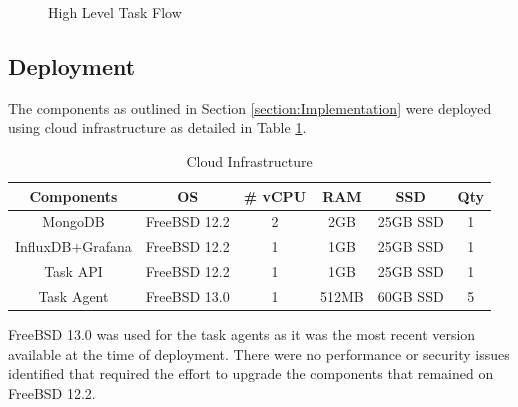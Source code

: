 \documentclass{mscreport}
\begin{document}

\begin{figure}[p]
	\begin{center}
        \scalebox{0.47}{}
		\caption{High Level Task Flow}
		\label{fig:task_flow}
	\end{center}
\end{figure}

\clearpage
\newpage

\subsection{Deployment}

The components as outlined in Section \ref{section:Implementation} were deployed using cloud infrastructure as detailed in Table \ref{table:implmentation_cloud}.

\begin{table}[H]
  \begin{center}
    \begin{tabular}{|c|c|c|c|c|c|}  %
      \hline
      \textbf{Components} & \textbf{OS} & \textbf{\# vCPU} & \textbf{RAM} & \textbf{SSD} & \textbf{Qty}\\
      \hline
      MongoDB & FreeBSD 12.2 & 2 & 2GB & 25GB SSD & 1 \\
      \hline
      InfluxDB$+$Grafana & FreeBSD 12.2 & 1 & 1GB & 25GB SSD & 1 \\
      \hline
      Task API & FreeBSD 12.2 & 1 & 1GB & 25GB SSD & 1 \\
      \hline
      Task Agent & FreeBSD 13.0 & 1 & 512MB & 60GB SSD & 5 \\
      \hline
    \end{tabular}
    \caption{Cloud Infrastructure}
    \label{table:implmentation_cloud} %
  \end{center}
\end{table}

\noindent
FreeBSD 13.0 was used for the task agents as it was the most recent version available at the time of deployment. There were no performance or security issues identified that required the effort to upgrade the components that remained on FreeBSD 12.2.
\end{document}
